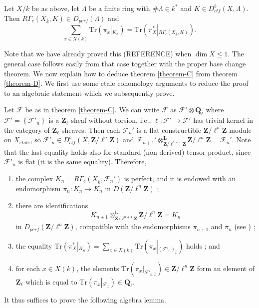 \begin{theorem}
\label{theorem-D}
Let $X/k$ be as above, let $\Lambda$ be a finite ring with $\#\Lambda \in k^*$
and $K\in D_{ctf}^b(X, \Lambda)$. Then $R\Gamma_c(X_{\bar k}, K)\in
D_{perf}(\Lambda)$ and
$$
\sum_{x\in X(k)}\text{Tr}\left(\pi_x\left|_{K_{\bar x}}\right.\right) =
\text{Tr}\left(\pi_X^*\left|_{R\Gamma_c(X_{\bar k}, K )}\right.\right).
$$
\end{theorem}

\noindent
Note that we have already proved this (REFERENCE) when $\dim X \leq 1$. The
general case follows easily from that case together with the proper base change
theorem. We now explain how to deduce theorem \ref{theorem-C} from theorem
\ref{theorem-D}. We first use some etale cohomology
arguments to reduce the proof
to an algebraic statement which we subsequently prove.

\medskip\noindent
Let $\mathcal{F}$ be as in theorem \ref{theorem-C}. We can write
$\mathcal{F}$ as
$\mathcal{F}'\otimes \mathbf{Q}_\ell$ where $\mathcal{F}' =
\left\{\mathcal{F}'_n\right\}$ is a $\mathbf{Z}_\ell$-sheaf without torsion,
i.e., $\ell : \mathcal{F}'\to \mathcal{F}'$ has trivial kernel in the
category of $\mathbf{Z}_\ell$-sheaves. Then each $\mathcal{F}_n'$ is a flat
constructible $\mathbf{Z}/\ell^n\mathbf{Z}$-module on $X_{etale}$, so
$\mathcal{F}'_n \in D_{ctf}^b(X, \mathbf{Z}/\ell^n\mathbf{Z})$ and
$\mathcal{F}_{n+1}'
\otimes^{\mathbf{L}}_{\mathbf{Z}/\ell^{n+1}\mathbf{Z}}
\mathbf{Z}/\ell^n\mathbf{Z} = \mathcal{F}_n'$.
Note that the last equality holds also
for standard (non-derived) tensor product, since $\mathcal{F}'_n$ is flat
(it is the same equality). Therefore,
\begin{enumerate}
\item
the complex $K_n= R\Gamma_c\left(X_{\bar k}, \mathcal{F}_n'\right)$ is perfect,
and it is endowed with an endomorphism $\pi_n: K_n\to K_n$ in
$D(\mathbf{Z}/\ell^n\mathbf{Z})$ ;
\item
there are identifications
$$
K_{n+1}
\otimes^{\mathbf{L}}_{\mathbf{Z}/\ell^{n+1}\mathbf{Z}}
\mathbf{Z}/\ell^n\mathbf{Z}
=
K_n
$$
in $D_{perf}(\mathbf{Z}/\ell^n\mathbf{Z})$, compatible with the endomorphisms
$\pi_{n+1}$ and $\pi_n$ (see \cite[Rapport 4.12]{SGA4.5}) ;
\item
the equality $\text{Tr}\left(\pi_X^*\left|_{K_n}\right.\right) = \sum_{x\in
X(k)}\text{Tr}\left(\pi_x\left|_{(\mathcal{F}'_n)_{\bar x}}\right.\right)$
holds ; and
\item
for each $x\in X(k)$, the elements
$\text{Tr}\left(\pi_x\big|_{\mathcal{F}'_{n, \bar x}}\right)
\in \mathbf{Z}/\ell^n\mathbf{Z}$
form an element of
$\mathbf{Z}_\ell$ which is equal to
$\text{Tr}\left(
\pi_x\left|_{\mathcal{F}_{\bar x}}\right.
\right) \in \mathbf{Q}_\ell$.
\end{enumerate}
It thus suffices to prove the following algebra lemma.

